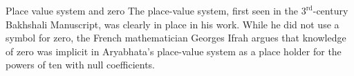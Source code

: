 \documentclass{beamer}
\begin{document}
\begin{frame}
	\begin{block}{Place value system and zero}
		The place-value system, first seen in the $3^{\text{rd}}$-century Bakhshali Manuscript, was clearly in place in his work. While he did not use a symbol for zero, the French mathematician Georges Ifrah argues that knowledge of zero was implicit in Aryabhata's place-value system as a place holder for the powers of ten with null coefficients.
\end{block}
\end{frame}
\end{document}
